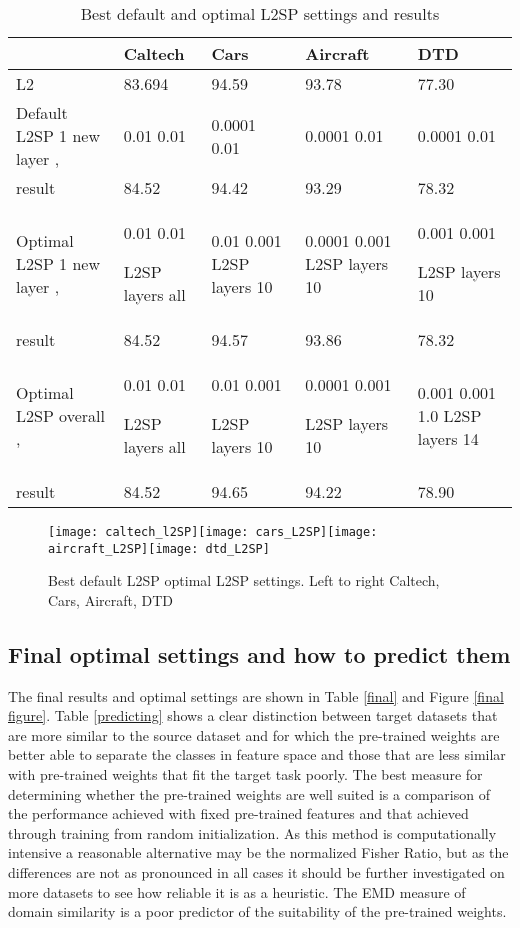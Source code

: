 \documentclass[]{article}
\begin{document}
\begin{table}[th]


\caption{Best default and optimal L2SP settings and results}
\label{L2SP optimal}
\centering
\begin{tabular}{p{2.2cm}p{2.3cm}p{2.3cm}p{2.3cm}p{2.3cm}}
\hline 
 & Caltech & Cars & Aircraft & DTD\tabularnewline
\hline 
L2 & 83.694  & 94.59 & 93.78 & 77.30\tabularnewline
Default L2SP 1 new layer ,  & 0.01 0.01  & 0.0001 0.01  & 0.0001 0.01  & 0.0001 0.01 \tabularnewline
result & 84.52 & 94.42  & 93.29 & 78.32\tabularnewline
\hline 
Optimal L2SP 1 new layer ,  & 0.01 0.01

L2SP layers all & 0.01 0.001 L2SP layers 10 & 0.0001 0.001 L2SP layers 10  & 0.001 0.001 

L2SP layers 10 \tabularnewline
result & 84.52 & 94.57  & 93.86 & 78.32\tabularnewline
\hline 
Optimal L2SP overall ,  & 0.01 0.01

L2SP layers all & 0.01 0.001 

L2SP layers 10  & 0.0001 0.001 

L2SP layers 10 & 0.001 0.001 1.0 L2SP layers 14\tabularnewline
result  & 84.52 & 94.65 & 94.22 & 78.90\tabularnewline
\hline 
\end{tabular}
\end{table}

\begin{figure}[th]

\begin{centering}
\texttt{[image: caltech\_l2SP]}\texttt{[image: cars\_L2SP]}\texttt{[image: aircraft\_L2SP]}\texttt{[image: dtd\_L2SP]}
\caption{Best default L2SP optimal L2SP settings. Left to right Caltech, Cars, Aircraft, DTD}
\label{L2SP optimal figure}
\par\end{centering}
\end{figure}


\subsection{Final optimal settings and how to predict them}

The final results and optimal settings are shown in Table \ref{final} and
Figure \ref{final figure}. Table \ref{predicting} shows a clear distinction between target
datasets that are more similar to the source dataset and for which
the pre-trained weights are better able to separate the classes in
feature space and those that are less similar with pre-trained weights
that fit the target task poorly. The best measure for determining whether the pre-trained weights are well suited is a comparison of the performance achieved with fixed pre-trained features and that achieved through training from random initialization. As this method is computationally intensive a reasonable alternative may be the normalized Fisher Ratio, but as the differences are not as pronounced in all cases it should be further investigated on more datasets to see how reliable it is as a heuristic. The EMD measure of domain similarity is a poor predictor of the suitability of the pre-trained weights.
\end{document}
